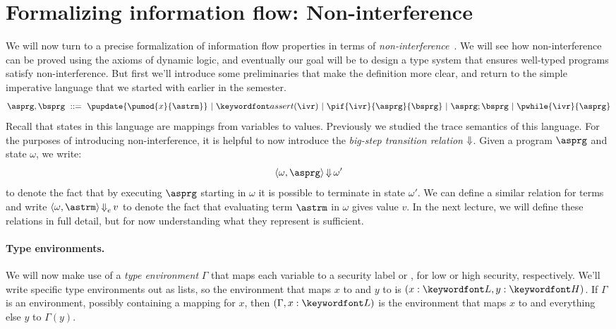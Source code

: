 \documentclass[11pt,twoside]{scrartcl}
\begin{document}
\section{Formalizing information flow: Non-interference}

We will now turn to a precise formalization of information flow properties in terms of \emph{non-interference}~\cite{Goguen1984}. We will see how non-interference can be proved using the axioms of dynamic logic, and eventually our goal will be to design a type system that ensures well-typed programs satisfy non-interference. But first we'll introduce some preliminaries that make the definition more clear, and return to the simple imperative language that we started with earlier in the semester.
\begin{equation*}
  \asprg,\bsprg ~\bebecomes~
  \pupdate{\pumod{x}{\astrm}}
  \alternative
  \passert{\ivr}
  \alternative
  \pif{\ivr}{\asprg}{\bsprg}
  \alternative
  \asprg;\bsprg
  \alternative
  \pwhile{\ivr}{\asprg}
\end{equation*}
Recall that states in this language are mappings from variables to values. Previously we studied the trace semantics of this language. For the purposes of introducing non-interference, it is helpful to now introduce the \emph{big-step transition relation} $\operatorname{\Downarrow}$. Given a program $\asprg$ and state $\omega$, we write:
\begin{equation}
\langle \omega, \asprg\rangle \bigstep \omega'
\end{equation}
to denote the fact that by executing $\asprg$ starting in $\omega$ it is possible to terminate in state $\omega'$. We can define a similar relation for terms and write $\langle \omega, \astrm\rangle \bigstep_e v$ to denote the fact that evaluating term $\astrm$ in $\omega$ gives value $v$. In the next lecture, we will define these relations in full detail, but for now understanding what they represent is sufficient.

\paragraph{Type environments.}
We will now make use of a \emph{type environment} $\Gamma$ that maps each variable to a security label \lowsec or \hisec, for low or high security, respectively. We'll write specific type environments out as lists, so the environment that maps $x$ to \lowsec and $y$ to \hisec is $(x:\lowsec, y:\hisec)$. If $\Gamma$ is an environment, possibly containing a mapping for $x$, then $(\Gamma, x:\lowsec)$ is the environment that maps $x$ to \lowsec and everything else $y$ to $\Gamma(y)$.
\end{document}
